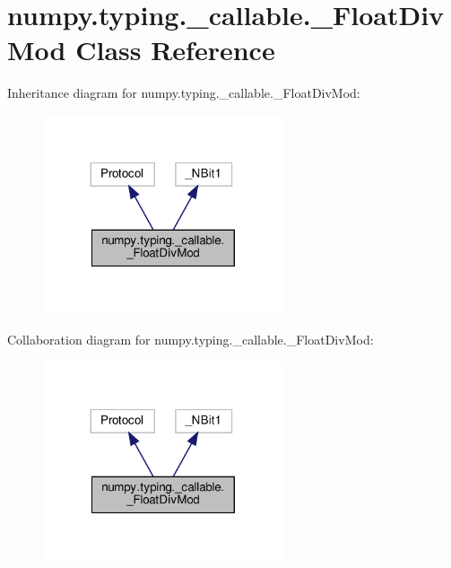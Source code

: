 \hypertarget{classnumpy_1_1typing_1_1__callable_1_1__FloatDivMod}{}\section{numpy.\+typing.\+\_\+callable.\+\_\+\+Float\+Div\+Mod Class Reference}
\label{classnumpy_1_1typing_1_1__callable_1_1__FloatDivMod}


Inheritance diagram for numpy.\+typing.\+\_\+callable.\+\_\+\+Float\+Div\+Mod\+:
\nopagebreak
\begin{figure}[H]
\begin{center}
\leavevmode
\includegraphics[width=200pt]{classnumpy_1_1typing_1_1__callable_1_1__FloatDivMod__inherit__graph}
\end{center}
\end{figure}


Collaboration diagram for numpy.\+typing.\+\_\+callable.\+\_\+\+Float\+Div\+Mod\+:
\nopagebreak
\begin{figure}[H]
\begin{center}
\leavevmode
\includegraphics[width=200pt]{classnumpy_1_1typing_1_1__callable_1_1__FloatDivMod__coll__graph}
\end{center}
\end{figure}
